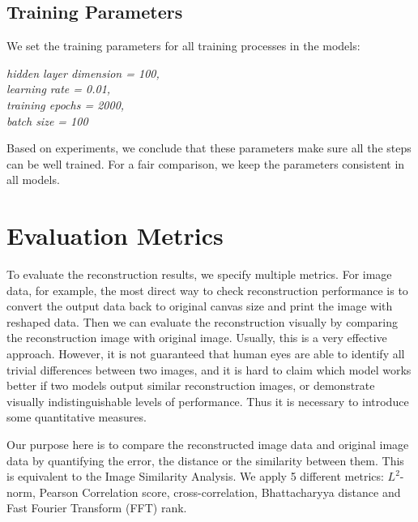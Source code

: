 \documentclass[12pt]{report} %
\begin{document}
\subsection{Training Parameters}
We set the training parameters for all training processes in the models:

\textit{hidden layer dimension = 100, \\
	learning rate = 0.01, \\
	training epochs = 2000, \\
	batch size = 100}

Based on experiments, we conclude that these parameters make sure all the steps can be well trained. For a fair comparison, we keep the parameters consistent in all models.

\section{Evaluation Metrics}
To evaluate the reconstruction results, we specify multiple metrics. For image data, for example, the most direct way to check reconstruction performance is to convert the output data back to original canvas size and print the image with reshaped data. Then we can evaluate the reconstruction visually by comparing the reconstruction image with original image. Usually, this is a very effective approach. However, it is not guaranteed that human eyes are able to identify all trivial differences between two images, and it is hard to claim which model works better if two models output similar reconstruction images, or demonstrate visually indistinguishable levels of performance. Thus it is necessary to introduce some quantitative measures. 

Our purpose here is to compare the reconstructed image data and original image data by quantifying the error, the distance or the similarity between them. This is equivalent to the Image Similarity Analysis\cite{PCC, CC, ISA}. We apply 5 different metrics: $L^2$-norm\cite{NORM}, Pearson Correlation score\cite{PCC}, cross-correlation\cite{CC}, Bhattacharyya distance\cite{ISA} and Fast Fourier Transform (FFT) rank\cite{ISA}.
\end{document}
